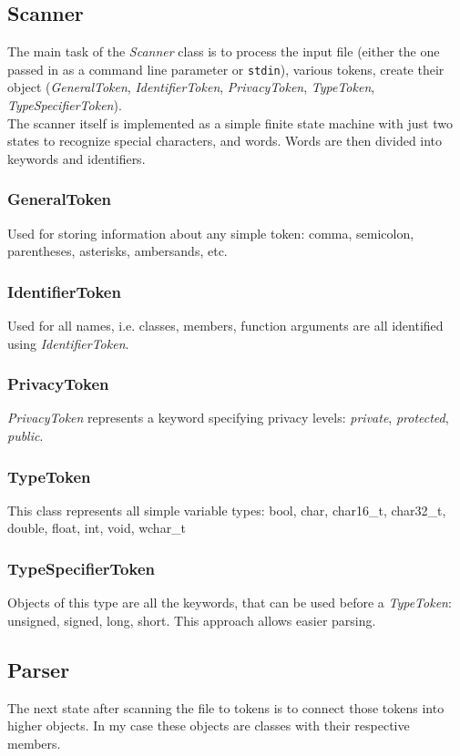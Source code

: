 \documentclass[10pt,a4paper]{article}[14.03.2017]
\begin{document}
		\subsection{Scanner}
			The main task of the \emph{Scanner} class is to process the input file (either the one passed in as a command line parameter or \texttt{stdin}), various tokens, create their object (\emph{GeneralToken}, \emph{IdentifierToken},	 \emph{PrivacyToken}, \emph{TypeToken}, \emph{TypeSpecifierToken}).\\
			The scanner itself is implemented as a simple finite state machine with just two states to recognize special characters, and words. Words are then divided into keywords and identifiers.
			\subsubsection{GeneralToken}
				Used for storing information about any simple token: comma, semicolon, parentheses, asterisks, ambersands, etc.
			\subsubsection{IdentifierToken}
				Used for all names, i.e. classes, members, function arguments are all identified using \emph{IdentifierToken}.
			\subsubsection{PrivacyToken}
				\emph{PrivacyToken} represents a keyword specifying privacy levels: \emph{private}, \emph{protected}, \emph{public}.
			\subsubsection{TypeToken}
				This class represents all simple variable types: bool, char, char16\_t, char32\_t, double, float, int, void, wchar\_t
			\subsubsection{TypeSpecifierToken}
				Objects of this type are all the keywords, that can be used before a \emph{TypeToken}: unsigned, signed, long, short. This approach allows easier parsing.
		
		\subsection{Parser}
			The next state after scanning the file to tokens is to connect those tokens into higher objects. In my case these objects are classes with their respective members.
\end{document}
